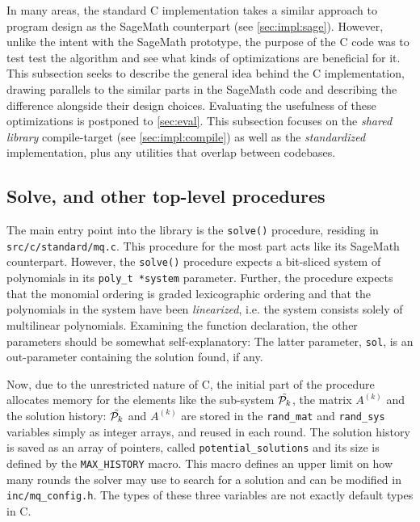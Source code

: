 In many areas, the standard C implementation takes a similar approach to program design as the SageMath counterpart (see \cref{sec:impl:sage}). However, unlike the intent with the SageMath prototype, the purpose of the C code was to test test the algorithm and see what kinds of optimizations are beneficial for it. This subsection seeks to describe the general idea behind the C implementation, drawing parallels to the similar parts in the SageMath code and describing the difference alongside their design choices. Evaluating the usefulness of these optimizations is postponed to \cref{sec:eval}. This subsection focuses on the \textit{shared library} compile-target (see \cref{sec:impl:compile}) as well as the \textit{standardized} implementation, plus any utilities that overlap between codebases.

\subsection{Solve, and other top-level procedures} \label{sec:impl:c:solve}
The main entry point into the library is the \texttt{solve()} procedure, residing in \texttt{src/c/standard/mq.c}. This procedure for the most part acts like its SageMath counterpart. However, the \texttt{solve()} procedure expects a bit-sliced system of polynomials in its \texttt{poly\_t *system} parameter. Further, the procedure expects that the monomial ordering is graded lexicographic ordering and that the polynomials in the system have been \textit{linearized}, i.e. the system consists solely of multilinear polynomials. Examining the function declaration, the other parameters should be somewhat self-explanatory:
The latter parameter, \texttt{sol}, is an out-parameter containing the solution found, if any.

Now, due to the unrestricted nature of C, the initial part of the procedure allocates memory for the elements like the sub-system $\Tilde{\mathcal{P}_k}$, the matrix $A^{(k)}$ and the solution history:
$\Tilde{\mathcal{P}_k}$ and $A^{(k)}$ are stored in the \texttt{rand\_mat} and \texttt{rand\_sys} variables simply as integer arrays, and reused in each round. The solution history is saved as an array of pointers, called \texttt{potential\_solutions} and its size is defined by the \texttt{MAX\_HISTORY} macro. This macro defines an upper limit on how many rounds the solver may use to search for a solution and can be modified in \texttt{inc/mq\_config.h}. The types of these three variables are not exactly default types in C.

